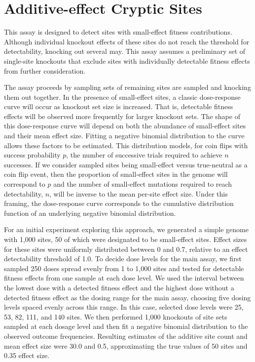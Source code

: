 \section{Additive-effect Cryptic Sites}

This assay is designed to detect sites with small-effect fitness contributions.
Although individual knockout effects of these sites do not reach the threshold for detectability, knocking out several may.
This assay assumes a preliminary set of single-site knockouts that exclude sites with individually detectable fitness effects from further consideration.

The assay proceeds by sampling sets of remaining sites are sampled and knocking them out together.
In the presence of small-effect sites, a classic dose-response curve will occur as knockout set size is increased.
That is, detectable fitness effects will be observed more frequently for larger knockout sets.
The shape of this dose-response curve will depend on both the abundance of small-effect sites and their mean effect size.
Fitting a negative binomial distribution to the curve allows these factors to be estimated.
This distribution models, for coin flips with success probability $p$, the number of successive trials required to achieve $n$ successes.
If we consider sampled sites being small-effect versus true-neutral as a coin flip event, then the proportion of small-effect sites in the genome will correspond to $p$ and the number of small-effect mutations required to reach detectability, $n$, will be inverse to the mean per-site effect size.
Under this framing, the dose-response curve corresponds to the cumulative distribution function of an underlying negative binomial distribution.

For an initial experiment exploring this approach, we generated a simple genome with 1,000 sites, 50 of which were designated to be small-effect sites.
Effect sizes for these sites were uniformly distributed between 0 and 0.7, relative to an effect detectability threshold of 1.0.
To decide dose levels for the main assay, we first sampled 250 doses spread evenly from 1 to 1,000 sites and tested for detectable fitness effects from one sample at each dose level.
We used the interval between the lowest dose with a detected fitness effect and the highest dose without a detected fitness effect as the dosing range for the main assay, choosing five dosing levels spaced evenly across this range.
In this case, selected dose levels were 25, 53, 82, 111, and 140 sites.
We then performed 1,000 knockouts of site sets sampled at each dosage level and then fit a negative binomial distribution to the observed outcome frequencies.
Resulting estimates of the additive site count and mean effect size were 30.0 and 0.5, approximating the true values of 50 sites and 0.35 effect size.

